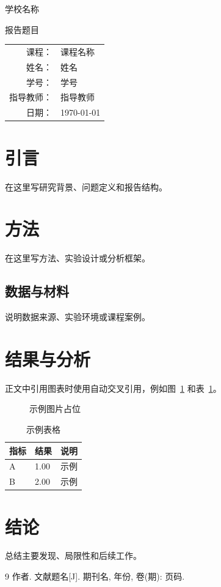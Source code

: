 \documentclass[UTF8,a4paper,12pt]{ctexart}
\newcommand{\schoolname}{学校名称}
\newcommand{\coursename}{课程名称}
\newcommand{\reporttitle}{报告题目}
\newcommand{\studentname}{姓名}
\newcommand{\studentid}{学号}
\newcommand{\teachername}{指导教师}
\newcommand{\submitdate}{\today}
\begin{document}
\begin{titlepage}
  \centering
  \vspace*{2cm}
  {\heiti \schoolname \par}
  \vspace{2cm}
  {\heiti \reporttitle \par}
  \vspace{2.5cm}
  {
  \begin{tabular}{rl}
    课程： & \coursename \\
    姓名： & \studentname \\
    学号： & \studentid \\
    指导教师： & \teachername \\
    日期： & \submitdate \\
  \end{tabular}
  \par}
  \vfill
\end{titlepage}

\tableofcontents
\newpage

\section{引言}
在这里写研究背景、问题定义和报告结构。

\section{方法}
在这里写方法、实验设计或分析框架。

\subsection{数据与材料}
说明数据来源、实验环境或课程案例。

\section{结果与分析}
正文中引用图表时使用自动交叉引用，例如图~\ref{fig:example} 和表~\ref{tab:example}。

\begin{figure}[htbp]
  \centering
  \fbox{\rule{0pt}{4cm}\rule{0.8\linewidth}{0pt}}
  \caption{示例图片占位}
  \label{fig:example}
\end{figure}

\begin{table}[htbp]
  \centering
  \caption{示例表格}
  \label{tab:example}
  \begin{tabular}{lll}
    \toprule
    指标 & 结果 & 说明 \\
    \midrule
    A & 1.00 & 示例 \\
    B & 2.00 & 示例 \\
    \bottomrule
  \end{tabular}
\end{table}

\section{结论}
总结主要发现、局限性和后续工作。

\begin{thebibliography}{9}
 作者. 文献题名[J]. 期刊名, 年份, 卷(期): 页码.
\end{thebibliography}
\end{document}
